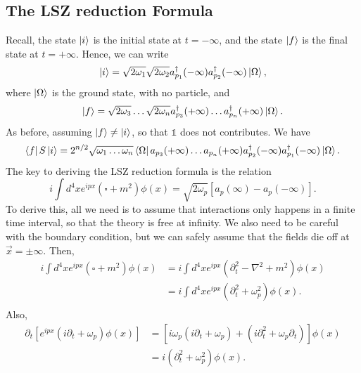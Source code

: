 \documentclass[11pt]{article}
\theoremstyle{definition}
\begin{document}
\subsection{The LSZ reduction Formula}
Recall, the state $\ket{i}$ is the initial state at $t= -\infty$, and the state $\ket{f}$ is the final state at $t=+\infty$. Hence, we can write
\begin{equation}
    \ket{i} = \sqrt{2\omega_1}\sqrt{2\omega_2}a_{p_1}^\dagger(-\infty) a_{p_2}^\dagger(-\infty) \ket{\Omega},
\end{equation}
where $\ket{\Omega}$ is the ground state, with no particle, and
\begin{equation}
    \ket{f} = \sqrt{2\omega_3}\dots\sqrt{2\omega_n}a_{p_3}^\dagger(+\infty) \dots a_{p_n}^\dagger(+\infty) \ket{\Omega}.
\end{equation}
As before, assuming $\ket{f} \neq \ket{i}$, so that $\mathds{1}$ does not contributes. We have
\begin{equation}
    \bra{f}S\ket{i} = 2^{n/2} \sqrt{\omega_1 \dots \omega_n}\bra{\Omega}a_{p_3}(+\infty) \dots a_{p_n}(+\infty)a_{p_2}^\dagger(-\infty) a_{p_1}^\dagger(-\infty) \ket{\Omega}.
    \label{Eq. S-matrix LSZ}
\end{equation}
The key to deriving the LSZ reduction formula is the relation
\begin{equation}
    i\int d^4x e^{ipx}(\square+m^2)\phi(x) = \sqrt{2\omega_p}[a_p(\infty) - a_p(-\infty)].
    \label{Eq. LSZ key}
\end{equation}
To derive this, all we need is to assume that interactions only happens in a finite time interval, so that the theory is free at infinity. We also need to be careful with the boundary condition, but we can safely assume that the fields die off at $\vec{x} = \pm\infty$. Then,
\begin{equation}
    \begin{aligned}
        i\int d^4x e^{ipx}(\square+m^2)\phi(x) &=i\int d^4x e^{ipx}(\partial_t^2 - \nabla^2 + m^2)\phi(x) \\
        &=i\int d^4x e^{ipx}(\partial_t^2 + \omega_p^2)\phi(x). \\
    \end{aligned}
\end{equation}
Also,
\begin{equation}
    \begin{aligned}
        \partial_t[e^{ipx}(i\partial_t+\omega_p)\phi(x)] &= [i\omega_p(i\partial_t+\omega_p) + (i\partial_t^2+\omega_p\partial_t)]\phi(x) \\
        &= i(\partial_t^2+\omega_p^2)\phi(x).
    \end{aligned}
\end{equation}
\end{document}
